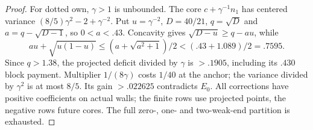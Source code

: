 \begin{proof}
For dotted own, $\gamma>1$ is unbounded. The core
$c+\gamma^{-1}n_1$ has centered variance
$(8/5)\gamma^2-2+\gamma^{-2}$.
Put $u=\gamma^{-2}$, $D=40/21$, $q=\sqrt D$ and
$a=q-\sqrt{D-1}$, so $0<a<.43$.
Concavity gives $\sqrt{D-u}\ge q-au$, while
\[
 au+\sqrt{u(1-u)}\le(a+\sqrt{a^2+1})/2
                         <(.43+1.089)/2=.7595.
\]
Since $q>1.38$, the projected deficit divided by $\gamma$
is $>.1905$, including its $.430$ block payment.
Multiplier $1/(8\gamma)$ costs $1/40$ at the anchor;
the variance divided by $\gamma^2$ is at most $8/5$.
Its gain $>.022625$ contradicts $E_0$.
All corrections have positive coefficients on actual walls;
the finite rows use projected points, the negative rows future
cores. The full zero-, one- and two-weak-end partition is exhausted.
\end{proof}

